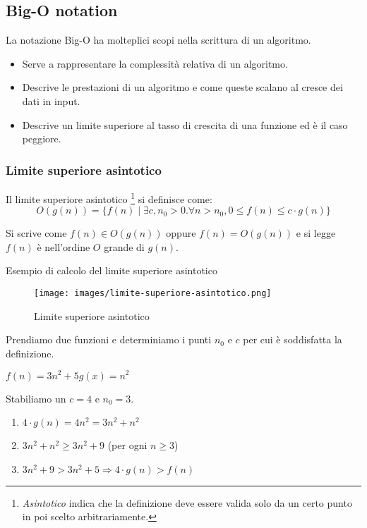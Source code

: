 \begin{itemize}
\begin{example}
	\end{example}
\end{itemize}

\subsection{Big-O notation}
La notazione Big-O ha molteplici scopi nella scrittura di un algoritmo.
\begin{itemize}
	\item Serve a rappresentare la complessità relativa di un algoritmo.
	\item Descrive le prestazioni di un algoritmo e come queste scalano al cresce dei dati in input.
	\item Descrive un limite superiore al tasso di crescita di una funzione ed è il caso peggiore.
\end{itemize}

\subsubsection{Limite superiore asintotico}
\begin{definition}
	Il limite superiore asintotico \footnote{\emph{Asintotico} indica che la definizione deve essere valida solo da un certo punto in poi scelto arbitrariamente.} si definisce come:
	\begin{equation}
		O(g(n)) = \{f(n) \mid \exists c, n_0 > 0 . \forall n > n_0, 0 \leq f(n) \leq c \cdot g(n)\}
	\end{equation}
\end{definition}
\noindent Si scrive come $f(n) \in O(g(n))$ oppure $f(n) = O(g(n))$ e si legge $f(n)$ è nell'ordine $O$ grande di $g(n)$.
\begin{example}
	Esempio di calcolo del limite superiore asintotico
\end{example}
\begin{wrapfigure}[7]{l}{8cm}
	\vspace{-15pt}
	\centering
	\texttt{[image: images/limite-superiore-asintotico.png]}
	\vspace{-5pt}
	\caption{Limite superiore asintotico}
\end{wrapfigure}
Prendiamo due funzioni e determiniamo i punti $n_0$ e $c$ per cui è soddisfatta la definizione.
\begin{center}
	\vspace{-5pt}
	$f(n) = 3n^2 + 5$\hspace{30pt}$g(x)=n^2$
\end{center}
Stabiliamo un $c = 4$ e $n_0 = 3$.
\begin{enumerate}
	\item $4 \cdot g(n) = 4n^2 = 3n^2 + n^2 $
	\item $3n^2 + n^2 \geq 3n^2 + 9 $ (per ogni $n \geq 3$)
	\item $3n^2 + 9 > 3n^2+5 \Longrightarrow 4 \cdot g(n) > f(n)$
\end{enumerate}

